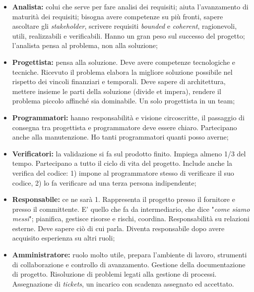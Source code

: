 \begin{itemize}

	\item \textbf{Analista:} colui che serve per fare analisi dei requisiti; aiuta l'avanzamento di maturità dei requisiti; bisogna avere competenze su più fronti, sapere ascoltare gli \textit{stakeholder}, scrivere requisiti \textit{bounded} e \textit{coherent}, ragionevoli, utili, realizzabili e verificabili. Hanno un gran peso sul successo del progetto; l'analista pensa al problema, non alla soluzione;
	
	\item \textbf{Progettista:} pensa alla soluzione. Deve avere competenze tecnologiche e tecniche. Ricevuto il problema elabora la migliore soluzione possibile nel rispetto dei vincoli finanziari e temporali. Deve sapere di architettura, mettere insieme le parti della soluzione (divide et impera), rendere il problema piccolo affinché sia dominabile. Un solo progettista in un team;
	
	\item \textbf{Programmatori:} hanno responsabilità e visione circoscritte, il passaggio di consegna tra progettista e programmatore deve essere chiaro. Partecipano anche alla manutenzione. Ho tanti programmatori quanti posso averne;
	
	\item \textbf{Verificatori:} la validazione si fa sul prodotto finito. Impiega almeno 1/3 del tempo. Partecipano a tutto il ciclo di vita del progetto. Include anche la verifica del codice: 1) impone al programmatore stesso di verificare il suo codice, 2) lo fa verificare ad una terza persona indipendente;
	
	\item \textbf{Responsabile:} ce ne sarà 1. Rappresenta il progetto presso il fornitore e presso il committente. E' quello che fa da intermediario, che dice "\textit{come siamo messi}"; pianifica, gestisce risorse e rischi, coordina. Responsabilità su relazioni esterne. Deve sapere ciò di cui parla. Diventa responsabile dopo avere acquisito esperienza su altri ruoli;
	
	\item \textbf{Amministratore:} ruolo molto utile, prepara l'ambiente di lavoro, strumenti di collaborazione e controllo di avanzamento. Gestione della documentazione di progetto. Risoluzione di problemi legati alla gestione di processi. Assegnazione di \textit{tickets}, un incarico con scadenza assegnato ed accettato.


\end{itemize}


